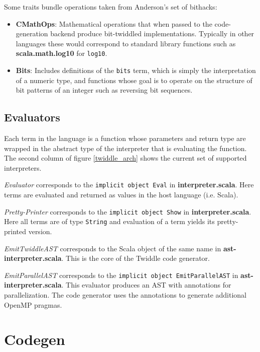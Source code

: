 \documentclass{article}
\begin{document}
Some traits bundle operations taken from Anderson's set of bithacks\cite{anderson2005bit}:
\begin{itemize}
	\item \textbf{CMathOps}: Mathematical operations that when passed to the code-generation backend produce bit-twiddled implementations. Typically in other languages these would correspond to standard library functions such as \textbf{scala.math.log10} for \texttt{log10}.
	\item \textbf{Bits}: Includes definitions of the \texttt{bits} term, which is simply the interpretation of a numeric type, and functions whose goal is to operate on the structure of bit patterns of an integer such as reversing bit sequences.
\end{itemize}

\subsection{Evaluators}
Each term in the language is a function whose parameters and return type are wrapped in the abstract type of the interpreter that is evaluating the function. The second column of figure \ref{twiddle_arch} shows the current set of supported interpreters.

\textit{Evaluator} corresponds to the \texttt{implicit object Eval} in \textbf{interpreter.scala}. Here terms are evaluated and returned as values in the host language (i.e. Scala).

\textit{Pretty-Printer} corresponds to the \texttt{implicit object Show} in \textbf{interpreter.scala}. Here all terms are of type \texttt{String} and evaluation of a term yields its pretty-printed version.

\textit{EmitTwiddleAST} corresponds to the Scala object of the same name in \textbf{ast-interpreter.scala}. This is the core of the Twiddle code generator.

\textit{EmitParallelAST} corresponds to the \texttt{implicit object EmitParallelAST} in \textbf{ast-interpreter.scala}. This evaluator produces an AST with annotations for parallelization. The code generator uses the annotations to generate additional OpenMP pragmas.

\section{Codegen}
\end{document}
